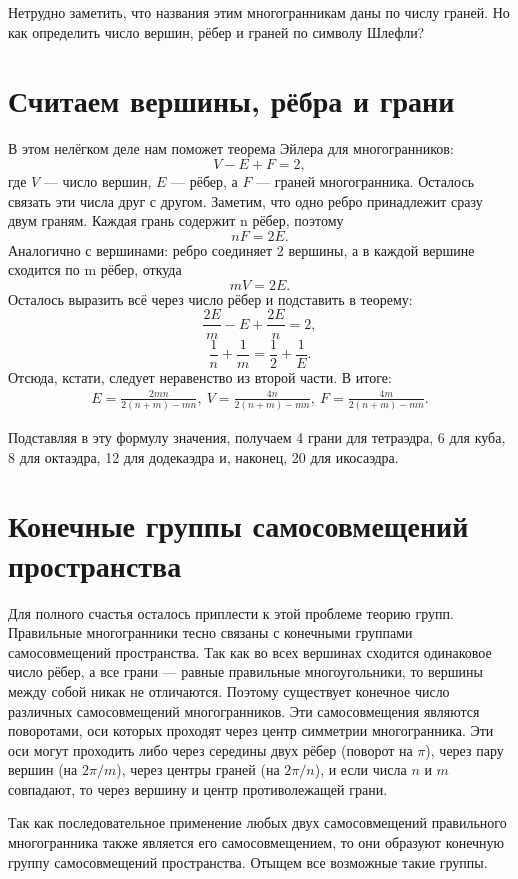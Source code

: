 \documentclass{ncc}
\begin{document}
Нетрудно заметить, что названия этим многогранникам даны по числу граней. Но как определить число вершин, рёбер и граней по символу Шлефли?

\section{Считаем вершины, рёбра и грани}

В этом нелёгком деле нам поможет теорема Эйлера для многогранников:
\[
    V - E + F = 2,
\]
где \(V\) --- число вершин, \(E\) --- рёбер, а \(F\) --- граней многогранника. Осталось связать эти числа друг с другом.
Заметим, что одно ребро принадлежит сразу двум граням. Каждая грань содержит n рёбер, поэтому
\[
    nF = 2E.
\]
Аналогично с вершинами: ребро соединяет 2 вершины, а в каждой вершине сходится по m рёбер, откуда
\[
    mV = 2E.
\]
Осталось выразить всё через число рёбер и подставить в теорему:
\[
    \frac{2E}{m} - E + \frac{2E}{n} = 2,
\]
\[
    \frac{1}{n} + \frac{1}{m} = \frac{1}{2} + \frac{1}{E}.
\]
Отсюда, кстати, следует неравенство из второй части. В итоге:
\[
\begin{array}{l}
    E = \frac{2mn}{2(n + m) - mn},\
    V = \frac{4n}{2(n + m) - mn},\
    F = \frac{4m}{2(n + m) - mn}.
\end{array}
\]

Подставляя в эту формулу значения, получаем 4 грани для тетраэдра, 6 для куба, 8 для октаэдра, 12 для додекаэдра и, наконец, 20 для икосаэдра.

\section{Конечные группы самосовмещений пространства}

Для полного счастья осталось приплести к этой проблеме теорию групп. Правильные многогранники тесно связаны с конечными группами самосовмещений пространства. Так как во всех вершинах сходится одинаковое число рёбер, а все грани --- равные правильные многоугольники, то вершины между собой никак не отличаются. Поэтому существует конечное число различных самосовмещений многогранников. Эти самосовмещения являются поворотами, оси которых проходят через центр симметрии многогранника. Эти оси могут проходить либо через середины двух рёбер (поворот на \(\pi\)), через пару вершин (на \(2\pi/m\)), через центры граней (на \(2\pi/n\)), и если числа \(n\) и \(m\) совпадают, то через вершину и центр противолежащей грани.

Так как последовательное применение любых двух самосовмещений правильного многогранника также является его самосовмещением, то они образуют конечную группу самосовмещений пространства. Отыщем все возможные такие группы.
\end{document}
